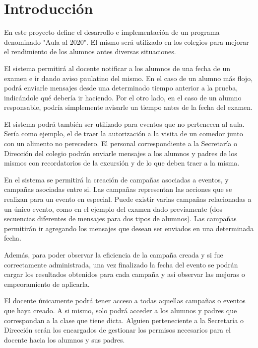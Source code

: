 \documentclass[a4paper, 11pt]{article}
\begin{document}
\pagestyle{myheadings}
\maketitle

\thispagestyle{empty}
\tableofcontents

\newpage

\section{Introducción}
En este proyecto define el desarrollo e implementación de un programa denominado "Aula al 2020". El mismo será utilizado en los colegios para mejorar el rendimiento de los alumnos antes diversas situaciones. 

El sistema permitirá al docente notificar a los alumnos de una fecha de un examen e ir dando aviso paulatino del mismo. En el caso de un alumno más flojo, podrá enviarle mensajes desde una determinado tiempo anterior a la prueba, indicándole qué debería ir haciendo. Por el otro lado, en el caso de un alumno responsable, podría simplemente avisarle un tiempo antes de la fecha del examen. 

El sistema podrá también ser utilizado para eventos que no pertenecen al aula. Sería como ejemplo, el de traer la autorización a la visita de un comedor junto con un alimento no perecedero. El personal correspondiente a la Secretaría o Dirección del colegio podrán enviarle mensajes a los alumnos y padres de los mismos con recordatorios de la excursión y de lo que deben traer a la misma.

En el sistema se permitirá la creación de campañas asociadas a eventos, y campañas asociadas entre si. Las campañas representan las acciones que se realizan para un evento en especial. Puede existir varias campañas relacionadas a un único evento, como en el ejemplo del examen dado previamente (dos secuencias diferentes de mensajes para dos tipos de alumnos). Las campañas permitirán ir agregando los mensajes que desean ser enviados en una determinada fecha. 

Además, para poder observar la eficiencia de la campaña creada y si fue correctamente administrada, una vez finalizado la fecha del evento se podrán cargar los resultados obtenidos para cada campaña y así observar las mejoras o empeoramiento de aplicarla. 

El docente únicamente podrá tener acceso a todas aquellas campañas o eventos que haya creado. A si mismo, solo podrá acceder a los alumnos y padres que correspondan a la clase que tiene dicta. Alguien perteneciente a la Secretaría o Dirección serán los encargados de gestionar los permisos necesarios para el docente hacia los alumnos y sus padres. 
\end{document}
